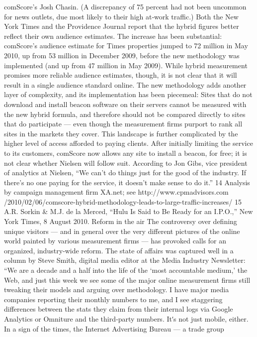 comScore’s Josh Chasin. (A discrepancy of 75 percent had not been
uncommon for news outlets, due most likely to their high at‐work traffic.)
Both the New York Times and the Providence Journal report that the hybrid
figures better reflect their own audience estimates. The increase has been
substantial: comScore’s audience estimate for Times properties jumped to
72 million in May 2010, up from 53 million in December 2009, before the
new methodology was implemented (and up from 47 million in May
2009).
While hybrid measurement promises more reliable audience estimates,
though, it is not clear that it will result in a single audience standard
online. The new methodology adds another layer of complexity, and its
implementation has been piecemeal: Sites that do not download and
install beacon software on their servers cannot be measured with the new
hybrid formula, and therefore should not be compared directly to sites
that do participate — even though the measurement firms purport to rank
all sites in the markets they cover.
This landscape is further complicated by the higher level of access
afforded to paying clients. After initially limiting the service to its
customers, comScore now allows any site to install a beacon, for free; it is
not clear whether Nielsen will follow suit. According to Jon Gibs, vice
president of analytics at Nielsen, ``We can’t do things just for the good of
the industry. If there’s no one paying for the service, it doesn’t make sense
to do it.''
14 Analysis by campaign management firm XA.net; see http://www.cpmadvisors.com
/2010/02/06/comscore-hybrid-methodology-leads-to-large-traffic-increases/
15 A.R. Sorkin & M.J. de la Merced, ``Hulu Is Said to Be Ready for an I.P.O.,'' New
York Times, 8 August 2010.
Reform in the air
The controversy over defining unique visitors — and in general over the
very different pictures of the online world painted by various
measurement firms — has provoked calls for an organized, industry‐wide
reform. The state of affairs was captured well in a column by Steve Smith,
digital media editor at the Media Industry Newsletter:
``We are a decade and a half into the life of the ‘most accountable
medium,’ the Web, and just this week we see some of the major
online measurement firms still tweaking their models and arguing
over methodology. I have major media companies reporting their
monthly numbers to me, and I see staggering differences between
the stats they claim from their internal logs via Google Analytics or
Omniture and the third‐party numbers. Itʹs not just mobile, either.
In a sign of the times, the Internet Advertising Bureau — a trade group
